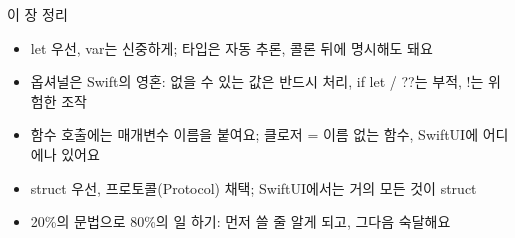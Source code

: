 \begin{tcbsummary}{이 장 정리}
\begin{itemize}
  \item let 우선, var는 신중하게; 타입은 자동 추론, 콜론 뒤에 명시해도 돼요
  \item 옵셔널은 Swift의 영혼: 없을 수 있는 값은 반드시 처리, if let / ??는 부적, !는 위험한 조작
  \item 함수 호출에는 매개변수 이름을 붙여요; 클로저 = 이름 없는 함수, SwiftUI에 어디에나 있어요
  \item struct 우선, 프로토콜(Protocol) 채택; SwiftUI에서는 거의 모든 것이 struct
  \item 20\%의 문법으로 80\%의 일 하기: 먼저 쓸 줄 알게 되고, 그다음 숙달해요
\end{itemize}

\end{tcbsummary}
